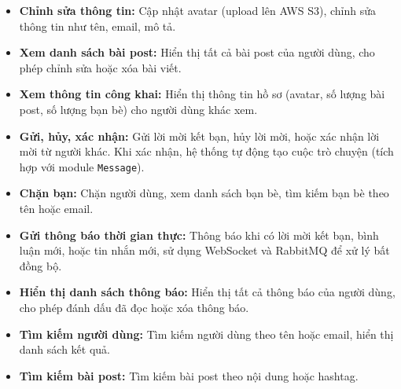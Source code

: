\vspace{0.3cm}
\begin{itemize}
    \renewcommand{\labelitemi}{-}
    \item \textbf{Chỉnh sửa thông tin:} Cập nhật avatar (upload lên AWS S3), chỉnh sửa thông tin như tên, email, mô tả.
    \item \textbf{Xem danh sách bài post:} Hiển thị tất cả bài post của người dùng, cho phép chỉnh sửa hoặc xóa bài viết.
    \item \textbf{Xem thông tin công khai:} Hiển thị thông tin hồ sơ (avatar, số lượng bài post, số lượng bạn bè) cho người dùng khác xem.
\end{itemize}

\vspace{0.3cm}
\begin{itemize}
    \renewcommand{\labelitemi}{-}
    \item \textbf{Gửi, hủy, xác nhận:} Gửi lời mời kết bạn, hủy lời mời, hoặc xác nhận lời mời từ người khác. Khi xác nhận, hệ thống tự động tạo cuộc trò chuyện (tích hợp với module \texttt{Message}).
    \item \textbf{Chặn bạn:} Chặn người dùng, xem danh sách bạn bè, tìm kiếm bạn bè theo tên hoặc email.
\end{itemize}

\vspace{0.3cm}
\begin{itemize}
    \renewcommand{\labelitemi}{-}
    \item \textbf{Gửi thông báo thời gian thực:} Thông báo khi có lời mời kết bạn, bình luận mới, hoặc tin nhắn mới, sử dụng WebSocket và RabbitMQ để xử lý bất đồng bộ.
    \item \textbf{Hiển thị danh sách thông báo:} Hiển thị tất cả thông báo của người dùng, cho phép đánh dấu đã đọc hoặc xóa thông báo.
\end{itemize}

\vspace{0.3cm}
\begin{itemize}
    \renewcommand{\labelitemi}{-}
    \item \textbf{Tìm kiếm người dùng:} Tìm kiếm người dùng theo tên hoặc email, hiển thị danh sách kết quả.
    \item \textbf{Tìm kiếm bài post:} Tìm kiếm bài post theo nội dung hoặc hashtag.
   
\end{itemize}

